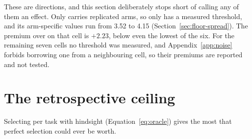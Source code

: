 These are directions, and this section deliberately stops short of calling any
of them an effect. Only  carries replicated arms, so only
 has a measured threshold, and its arm-specific values run
from 3.52 to 4.15\pp{} (Section~\ref{sec:floor-spread}). The \mSoM{} premium
over \mVis{} on that cell is $+2.23$\pp, below even the lowest of the six. For
the remaining seven cells no threshold was measured, and Appendix~\ref{app:noise}
forbids borrowing one from a neighbouring cell, so their premiums are reported
and not tested.


\FloatBarrier
\section{The retrospective ceiling}
\label{sec:ceiling}

Selecting per task with hindsight (Equation~\ref{eq:oracle}) gives the most that
perfect selection could ever be worth.

